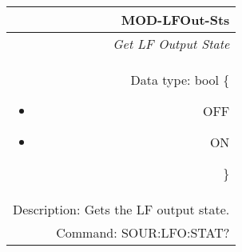\documentclass[openany]{article}
\begin{document}
		\begin{tabular}{N}
			\hline
			\bfseries MOD-LFOut-Sts \\ \hline
			\emph{Get LF Output State} \\
			Data type: bool \{\begin{itemize}[noitemsep]
				\small
				\item[] OFF
				\item[] ON
			\end{itemize}\} \\
			Description: Gets the LF output state. \\
			Command: SOUR:LFO:STAT? \\
			
		\end{tabular}
%
\end{document}
